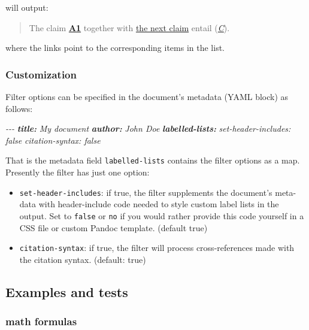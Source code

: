 \documentclass[
]{article}
\newenvironment{Shaded}{}{}
\newcommand{\AnnotationTok}[1]{\textcolor[rgb]{0.38,0.63,0.69}{\textbf{\textit{#1}}}}
\newcommand{\CommentTok}[1]{\textcolor[rgb]{0.38,0.63,0.69}{\textit{#1}}}
\providecommand{\tightlist}{%
  \setlength{\itemsep}{0pt}\setlength{\parskip}{0pt}}
\begin{document}
will output:

\begin{quote}
The claim \href{}{\textbf{A1}} together with \href{}{the next claim}
entail (\href{}{\emph{C}}).
\end{quote}

where the links point to the corresponding items in the list.

\hypertarget{customization}{%
\subsubsection{Customization}\label{customization}}

Filter options can be specified in the document's metadata (YAML block)
as follows:

\begin{Shaded}
\begin{Highlighting}[]
\CommentTok{{-}{-}{-}}
\AnnotationTok{title:}\CommentTok{ My document}
\AnnotationTok{author:}\CommentTok{ John Doe}
\AnnotationTok{labelled{-}lists:}
\CommentTok{  set{-}header{-}includes: false}
\CommentTok{  citation{-}syntax: false}
\end{Highlighting}
\end{Shaded}

That is the metadata field \texttt{labelled-lists} contains the filter
options as a map. Presently the filter has just one option:

\begin{itemize}
\tightlist
\item
  \texttt{set-header-includes}: if true, the filter supplements the
  document's meta-data with header-include code needed to style custom
  label lists in the output. Set to \texttt{false} or \texttt{no} if you
  would rather provide this code yourself in a CSS file or custom Pandoc
  template. (default true)
\item
  \texttt{citation-syntax}: if true, the filter will process
  cross-references made with the citation syntax. (default: true)
\end{itemize}

\hypertarget{examples-and-tests}{%
\subsection{Examples and tests}\label{examples-and-tests}}

\hypertarget{math-formulas}{%
\subsubsection{math formulas}\label{math-formulas}}
\end{document}
